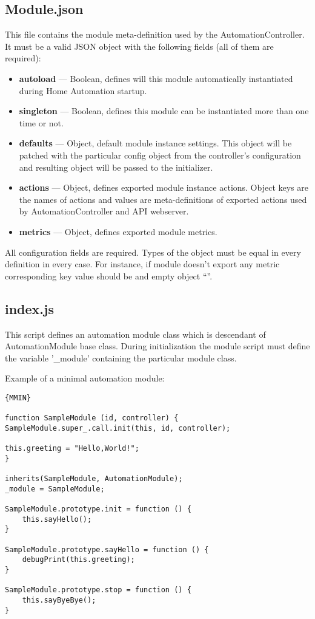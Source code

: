 \subsection{Module.json}

This file contains the module meta-definition used by the AutomationController. It must 
be a valid JSON object with the following fields (all of them are required):
\begin{itemize}
\item \textbf{autoload} — Boolean, defines will this module automatically instantiated during Home Automation startup.
\item \textbf{singleton} — Boolean, defines this module can be instantiated more than one time or not.
\item \textbf{defaults} — Object, default module instance settings. This object will be patched with the particular 
config object from the controller's configuration and resulting object will be passed to the initializer.
\item \textbf{actions} — Object, defines exported module instance actions. Object keys 
are the names of actions and  values are meta-definitions of exported actions used by 
AutomationController and API webserver.
\item \textbf{metrics} — Object, defines exported module metrics.
\end{itemize}
All configuration fields are required. Types of the object must be equal in every 
definition in every case. For instance, if module doesn't export any metric corresponding 
key value should be and empty object “{}”.

\subsection{index.js}
 
This script defines an automation module class which is descendant of AutomationModule base class.
During initialization the module script must define the variable '\_module' containing the particular module class.


Example of a minimal automation module:

\begin{lstlisting}[caption=Minimal Module,basicstyle=\small,columns=fullflexible]{MMIN}

function SampleModule (id, controller) {
SampleModule.super_.call.init(this, id, controller);

this.greeting = "Hello,World!";
}

inherits(SampleModule, AutomationModule);
_module = SampleModule;

SampleModule.prototype.init = function () {
    this.sayHello();
}

SampleModule.prototype.sayHello = function () {
    debugPrint(this.greeting);
} 

SampleModule.prototype.stop = function () {
    this.sayByeBye();
}    

\end{lstlisting} 
 
